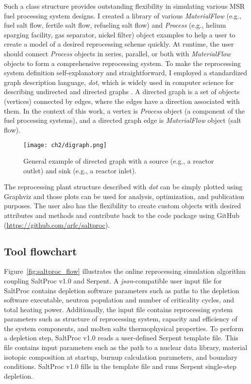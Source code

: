 Such a class structure provides outstanding flexibility in simulating 
various \gls{MSR} fuel processing system designs. I created a library of 
various \textit{MaterialFlow} (e.g., fuel salt flow, fertile salt flow, 
refueling salt flow) and \textit{Process} (e.g., helium sparging facility, gas 
separator, nickel filter) object examples to help a user to create a model of 
a desired reprocessing scheme quickly. At runtime, the user
should connect \textit{Process} objects in series, parallel, or both with 
\textit{MaterialFlow} objects to form a comprehensive reprocessing system. To 
make the reprocessing system definition self-explanatory and straightforward, 
I employed a standardized graph description language, \emph{dot}, which is 
widely used in computer science for describing undirected and directed graphs 
\cite{gansner_drawing_1996}. A directed graph is a set of objects 
(vertices) connected by edges, where the edges have a direction associated 
with them. In the context of this work, a vertex is \textit{Process} object 
(a component of the fuel processing systems), and a directed graph edge is 
\textit{MaterialFlow} object (salt flow).
\begin{figure}[hbt!] %
	\centering
	\texttt{[image: ch2/digraph.png]}
	\vspace{-0.1in}
	\caption{General example of directed graph with a source (e.g., a reactor 
		outlet) and sink (e.g., a reactor inlet).}
	\label{fig:digraph}
\end{figure}

The reprocessing plant structure described with \emph{dot} can be simply 
plotted using Graphviz \cite{ellson_graphviz_2003} and those plots can be used 
for analysis, optimization, and publication purposes. The user also has the 
flexibility to create custom objects with desired attributes and methods and 
contribute back to the code package using GitHub 
(\url{https://github.com/arfc/saltproc}).	


\subsection{Tool flowchart}
Figure~\ref{fig:saltproc_flow} illustrates the online reprocessing simulation 
algorithm coupling SaltProc v1.0 and Serpent. A \emph{json}-compatible 
user input file for SaltProc contains depletion software parameters such as 
paths to the depletion software executable, neutron population and number of 
criticality cycles, and total heating power. Additionally, the input file 
contains reprocessing system parameters such as structure of reprocessing 
system, capacity and efficiency of the system components, and molten salts 
thermophysical properties. To perform a depletion step, SaltProc v1.0 reads a 
user-defined Serpent template file. This file contains input parameters such 
as the path to a nuclear data library, material isotopic composition at 
startup, burnup calculation parameters, and boundary conditions. SaltProc v1.0 
fills in the template file and runs Serpent single-step depletion. 

